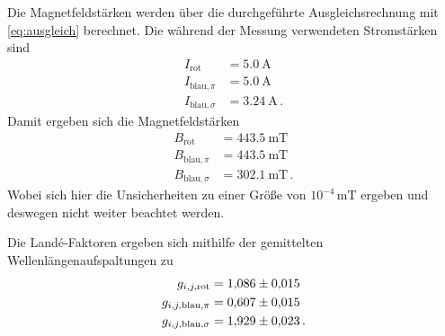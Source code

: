 Die Magnetfeldstärken werden über die durchgeführte Ausgleichsrechnung mit \autoref{eq:ausgleich} berechnet.
Die während der Messung verwendeten Stromstärken sind
\begin{align*}
    I_{\text{rot}} &= \SI{5.0}{\ampere} \\
    I_{\text{blau},\pi} &= \SI{5.0}{\ampere} \\
    I_{\text{blau},\sigma} &= \SI{3.24}{\ampere} \, .
\end{align*}
Damit ergeben sich die Magnetfeldstärken 
\begin{align*}
    B_{\text{rot}} &= \SI{443.5}{\milli\tesla} \\
    B_{\text{blau},\pi} &= \SI{443.5}{\milli\tesla} \\
    B_{\text{blau},\sigma} &= \SI{302.1}{\milli\tesla} \, .
\end{align*}
Wobei sich hier die Unsicherheiten zu einer Größe von $10^{-4}\,\si{\milli\tesla}$ ergeben und deswegen nicht weiter beachtet werden.

Die Landé-Faktoren ergeben sich mithilfe der gemittelten Wellenlängenaufspaltungen zu
\begin{align*}
    g_{i,j,\text{rot}} &= \num{1.086+-0.015} \\
    g_{i,j,\text{blau},\pi} &= \num{0.607+-0.015} \\
    g_{i,j,\text{blau},\sigma} &= \num{1.929+-0.023} \, .
\end{align*}